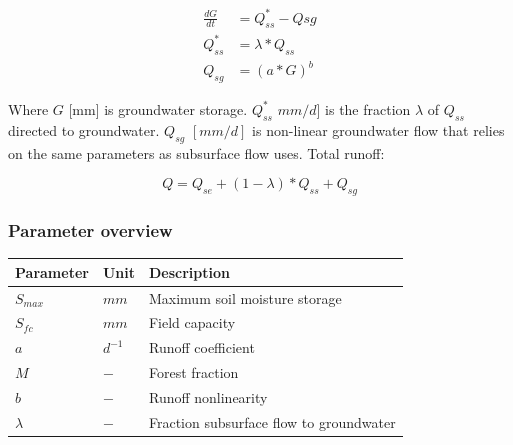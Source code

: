 \begin{align}
	\frac{dG}{dt} &= Q_{ss}^* - Q{sg} \\
	Q_{ss}^* &= \lambda*Q_{ss} \\
	Q_{sg} &= (a*G)^b
\end{align}

Where $G$ [mm] is groundwater storage. $Q_{ss}^*$ $mm/d]$ is the fraction $\lambda$ of $Q_{ss}$ directed to groundwater. $Q_{sg}$ $[mm/d]$ is non-linear groundwater flow that relies on the same parameters as subsurface flow uses. Total runoff:

\begin{equation}
	Q = Q_{se} + (1-\lambda)*Q_{ss} + Q_{sg}
\end{equation}


\subsubsection{Parameter overview}
\begin{table}[htbp]
  \centering
    \begin{tabular}{lll}
    \toprule
    Parameter & Unit  & Description \\
    \midrule
    $S_{max}$ & $mm$  & Maximum soil moisture storage \\
    $S_{fc}$ & $mm$  & Field capacity \\
    $a$   & $d^{-1}$ & Runoff coefficient \\
    $M$   & $-$   & Forest fraction \\
    $b$   & $-$   & Runoff nonlinearity \\
    $\lambda$ & $-$   & Fraction subsurface flow to groundwater \\
    \bottomrule
    \end{tabular}%
  \label{tab:addlabel}%
\end{table}%
